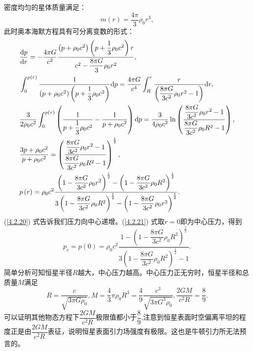 \documentclass[11pt, a4paper, oneside, onecolumn]{ctexart}
\numberwithin{equation}{subsection}
\begin{document}
密度均匀的星体质量满足：
\begin{equation}
m\left(r\right)=\frac{4\pi}{3}\rho_{0}r^{3},\label{4.2.19}
\end{equation}
此时奥本海默方程具有可分离变数的形式：
\begin{align}
&\frac{\mathrm{d}p}{\mathrm{d}r}=-\frac{4\pi G}{c^{2}}\frac{\left(p+\rho_{0}c^{2}\right)\left(p+\dfrac{1}{3}\rho_{0}c^{2}\right)r}{c^{2}-\dfrac{8\pi G}{3}\rho_{0}r^{2}},\label{4.2.20}\\
&\int_{0}^{p\left(r\right)}\frac{1}{\left(p+\rho_{0}c^{2}\right)\left(p+\dfrac{1}{3}\rho_{0}c^{2}\right)}\mathrm{d}p=\frac{4\pi G}{c^{4}}\int_{R}^{r}\frac{r}{\left(\dfrac{8\pi G}{3c^{2}}\rho_{0}r^{2}-1\right)}\mathrm{d}r,\notag\\
&\frac{3}{2\rho_{0}c^{2}}\int_{0}^{p\left(r\right)}\left(\frac{1}{p+\dfrac{1}{3}\rho_{0}c^{2}}-\frac{1}{p+\rho_{0}c^{2}}\right)\mathrm{d}p=\frac{3}{4\rho_{0}c^{2}}\ln\left(\frac{\dfrac{8\pi G}{3c^{2}}\rho_{0}r^{2}-1}{\dfrac{8\pi G}{3c^{2}}\rho_{0}R^{2}-1}\right),\notag\\
&\frac{3p+\rho_{0}c^{2}}{p+\rho_{0}c^{2}}=\left(\frac{\dfrac{8\pi G}{3c^{2}}\rho_{0}r^{2}-1}{\dfrac{8\pi G}{3c^{2}}\rho_{0}R^{2}-1}\right)^{\frac{1}{2}},\notag\\
&p\left(r\right)=\rho_{0}c^{2}\frac{\left(1-\dfrac{8\pi G}{3c^{2}}\rho_{0}r^{2}\right)^{\frac{1}{2}}-\left(1-\dfrac{8\pi G}{3c^{2}}\rho_{0}R^{2}\right)^{\frac12}}{3\left(1-\dfrac{8\pi G}{3c^{2}}\rho_{0}R^{2}\right)^{\frac12}-\left(1-\dfrac{8\pi G}{3c^{2}}\rho_{0}r^{2}\right)^{\frac{1}{2}}}.\label{4.2.21}
\end{align}
(\ref{4.2.20}) 式告诉我们压力向中心递增。(\ref{4.2.21}) 式取$r=0$即为中心压力，得到
\begin{equation}
p_{c}=p\left(0\right)=\rho_{0}c^{2}\frac{1-\left(1-\dfrac{8\pi G}{3c^{2}}\rho_{0}R^{2}\right)^{\frac12}}{3\left(1-\dfrac{8\pi G}{3c^{2}}\rho_{0}R^{2}\right)^{\frac12}-1}.
\end{equation}
简单分析可知恒星半径$R$越大，中心压力越高。中心压力正无穷时，恒星半径和总质量$M$满足
\begin{equation}
R=\frac{c}{\sqrt{3\pi G\rho_{0}}},M=\frac{4}{3}\pi \rho_{0}R^{3}=\frac{4}{9}\frac{c^{3}}{\sqrt{3\pi G^{3}\rho_{0}}},\frac{2GM}{c^{2}R}=\frac{8}{9}.
\end{equation}
可以证明其他物态方程下$\dfrac{2GM}{c^{2}R}$极限值都小于$\dfrac{8}{9}$,注意到恒星表面时空偏离平坦的程度正是由$\dfrac{2GM}{c^{2}R}$表征，说明恒星表面引力场强度有极限。这也是牛顿引力所无法预言的。
\end{document}
